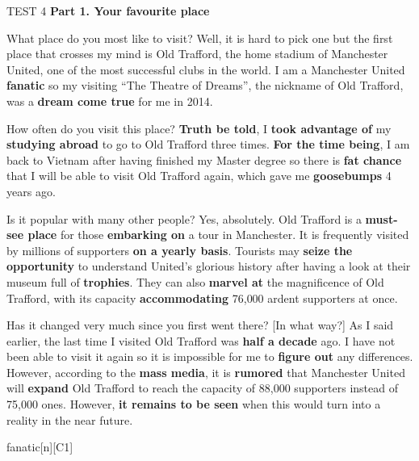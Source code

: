 \begin{glossarymc}[Cambridge 4]
    \begin{test}{TEST 4}
    \noindent
    \textbf{Part 1. Your favourite place}
	\begin{qa}{What place do you most like to visit?}
	Well, it is hard to pick one but the first place that crosses my mind is Old Trafford, the home stadium of Manchester United, one of the most successful clubs in the world. I am a Manchester United \textbf{fanatic} so my visiting “The Theatre of Dreams”, the nickname of Old Trafford, was a \textbf{dream come true} for me in 2014.
	\end{qa}

	\begin{qa}{How often do you visit this place?}
	\textbf{Truth be told}, I \textbf{took advantage of} my \textbf{studying abroad} to go to Old Trafford three times. \textbf{For the time being}, I am back to Vietnam after having finished my Master degree so there is \textbf{fat chance} that I will be able to visit Old Trafford again, which gave me \textbf{goosebumps} 4 years ago.
	\end{qa}

	\begin{qa}{Is it popular with many other people?}
	Yes, absolutely. Old Trafford is a \textbf{must-see place} for those \textbf{embarking on} a tour in Manchester. It is frequently visited by millions of supporters \textbf{on a yearly basis}. Tourists may \textbf{seize the opportunity} to understand United's glorious history after having a look at their museum full of \textbf{trophies}. They can also \textbf{marvel at} the magnificence of Old Trafford, with its capacity \textbf{accommodating} 76{,}000 ardent supporters at once.
	\end{qa}

	\begin{qa}{Has it changed very much since you first went there? [In what way?]}
	As I said earlier, the last time I visited Old Trafford was \textbf{half a decade} ago. I have not been able to visit it again so it is impossible for me to \textbf{figure out} any differences. However, according to the \textbf{mass media}, it is \textbf{rumored} that Manchester United will \textbf{expand} Old Trafford to reach the capacity of 88{,}000 supporters instead of 75{,}000 ones. However, \textbf{it remains to be seen} when this would turn into a reality in the near future.
	\end{qa}

        \begin{VocabExplain}[Part 1]
			\begin{ExplainCard}{fanatic}[n][C1]
			\end{ExplainCard}


\end{VocabExplain}
\end{test}
\end{glossarymc}
